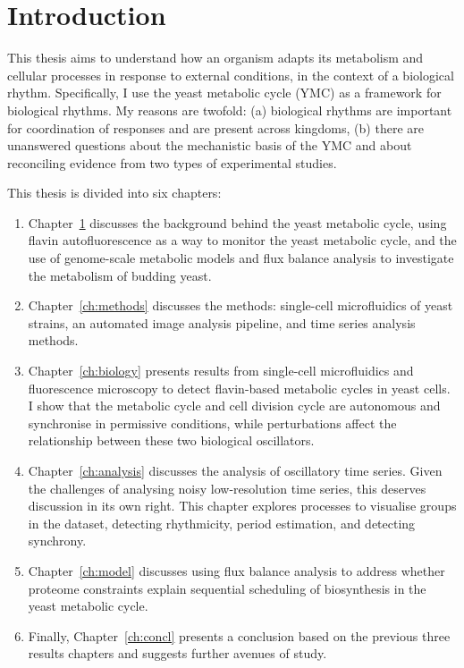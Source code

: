 \chapter{Introduction}
\label{ch:intro}

This thesis aims to understand how an organism adapts its metabolism and cellular processes in response to external conditions, in the context of a biological rhythm.
Specifically, I use the yeast metabolic cycle (YMC) as a framework for biological rhythms.
My reasons are twofold: (a) biological rhythms are important for coordination of responses and are present across kingdoms, (b) there are unanswered questions about the mechanistic basis of the YMC and about reconciling evidence from two types of experimental studies.

This thesis is divided into six chapters:
\begin{enumerate}
  \item Chapter~\ref{ch:intro} discusses the background behind the yeast metabolic cycle, using flavin autofluorescence as a way to monitor the yeast metabolic cycle, and the use of genome-scale metabolic models and flux balance analysis to investigate the metabolism of budding yeast.
  \item Chapter~\ref{ch:methods} discusses the methods: single-cell microfluidics of yeast strains, an automated image analysis pipeline, and time series analysis methods.
  \item Chapter~\ref{ch:biology} presents results from single-cell microfluidics and fluorescence microscopy to detect flavin-based metabolic cycles in yeast cells.
        I show that the metabolic cycle and cell division cycle are autonomous and synchronise in permissive conditions, while perturbations affect the relationship between these two biological oscillators.
  \item Chapter~\ref{ch:analysis} discusses the analysis of oscillatory time series.
        Given the challenges of analysing noisy low-resolution time series, this deserves discussion in its own right.
        This chapter explores processes to visualise groups in the dataset, detecting rhythmicity, period estimation, and detecting synchrony.
  \item Chapter~\ref{ch:model} discusses using flux balance analysis to address whether proteome constraints explain sequential scheduling of biosynthesis in the yeast metabolic cycle.
  \item Finally, Chapter~\ref{ch:concl} presents a conclusion based on the previous three results chapters and suggests further avenues of study.
\end{enumerate}

